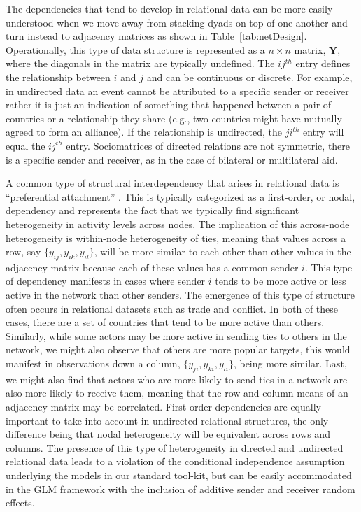 \documentclass[12pt,pdflatex]{elsarticle}
\begin{document}
The dependencies that tend to develop in relational data can be more easily understood when we move away from stacking dyads on top of one another and turn instead to adjacency matrices as shown in Table~\ref{tab:netDesign}. Operationally, this type of data structure is represented as a $n \times n$ matrix, $\mathbf{Y}$, where the diagonals in the matrix are typically undefined.
The $ij^{th}$ entry defines the relationship between $i$ and $j$ and can be continuous or discrete. For example, in undirected data an event cannot be attributed to a specific sender or receiver rather it is just an indication of something that happened between a pair of countries or a relationship they share (e.g., two countries might have mutually agreed to form an alliance). If the relationship is undirected, the $ji^{th}$ entry will equal the $ij^{th}$ entry. Sociomatrices of directed relations are not symmetric, there is a specific sender and receiver, as in the case of bilateral or multilateral aid.

A common type of structural interdependency that arises in relational data is ``preferential attachment'' \citep{barabasi:reka:1999}. This is typically categorized as a first-order, or nodal, dependency and represents the fact that we typically find significant heterogeneity in activity levels across nodes. The implication of this across-node heterogeneity is within-node heterogeneity of ties, meaning that values across a row, say $\{y_{ij},y_{ik},y_{il}\}$, will be more similar to each other than other values in the adjacency matrix because each of these values has a common sender $i$. This type of dependency manifests in cases where sender $i$ tends to be more active or less active in the network than other senders. The emergence of this type of structure often occurs in relational datasets such as trade and conflict. In both of these cases, there are a set of countries that tend to be more active than others. Similarly, while some actors may be more active in sending ties to others in the network, we might also observe that others are more popular targets, this would manifest in observations down a column, $\{y_{ji},y_{ki},y_{li}\}$, being more similar. Last, we might also find that actors who are more likely to send ties in a network are also more likely to receive them, meaning that the row and column means of an adjacency matrix may be correlated. First-order dependencies are equally important to take into account in undirected relational structures, the only difference being that nodal heterogeneity will be equivalent across rows and columns. The presence of this type of heterogeneity in directed and undirected relational data leads to a violation of the conditional independence assumption underlying the models in our standard tool-kit, but can be easily accommodated in the GLM framework with the inclusion of additive sender and receiver random effects.
\end{document}
